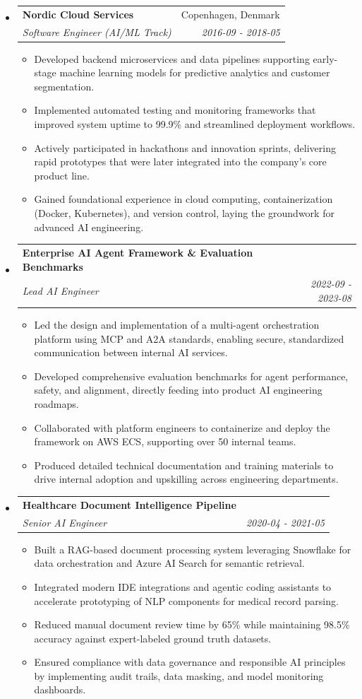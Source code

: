 \documentclass[letterpaper,11pt]{article}
\makeatletter
\newlength{\outerbordwidth}
\newcommand{\resitem}[1]{\item #1 \vspace{-2pt}}
\newcommand{\resheading}[1]{\vspace{6pt}
    \parbox{\textwidth}{\setlength{\FrameSep}{\outerbordwidth}
        \begin{shaded}
    \setlength{\fboxsep}{0pt}\framebox[\textwidth][l]{\setlength{\fboxsep}{2pt}\fcolorbox{shadecolorB}{shadecolorB}{\textbf{\sffamily{\mbox{~}\makebox[6.8in][l]{\large #1} \vphantom{p\^{E}}}}}}
        \end{shaded}
    }\vspace{-6pt}
    }
\newcommand{\ressubheading}[4]{
    \begin{tabular*}{6.5in}{p{4.8in}@{\extracolsep{\fill}}r}
            \textbf{#1} & #2 \\
            \textit{#3} & \textit{#4} \\
    \end{tabular*}\vspace{-8pt}}
\makeatother
\begin{document}
\begin{itemize}
\begin{itemize}
        \end{itemize}
        \item \ressubheading{Nordic Cloud Services}{Copenhagen, Denmark}{Software Engineer (AI/ML Track)}{2016-09 - 2018-05}
        \begin{itemize}
            \resitem{Developed backend microservices and data pipelines supporting early-stage machine learning models for predictive analytics and customer segmentation.}
            \resitem{Implemented automated testing and monitoring frameworks that improved system uptime to 99.9\% and streamlined deployment workflows.}
            \resitem{Actively participated in hackathons and innovation sprints, delivering rapid prototypes that were later integrated into the company’s core product line.}
            \resitem{Gained foundational experience in cloud computing, containerization (Docker, Kubernetes), and version control, laying the groundwork for advanced AI engineering.}
        \end{itemize}
      \end{itemize}
      \resheading{Projects}
      \begin{itemize}
        \item \ressubheading{Enterprise AI Agent Framework \& Evaluation Benchmarks}{}{Lead AI Engineer}{2022-09 - 2023-08}
        \begin{itemize}
            \resitem{Led the design and implementation of a multi-agent orchestration platform using MCP and A2A standards, enabling secure, standardized communication between internal AI services.}
            \resitem{Developed comprehensive evaluation benchmarks for agent performance, safety, and alignment, directly feeding into product AI engineering roadmaps.}
            \resitem{Collaborated with platform engineers to containerize and deploy the framework on AWS ECS, supporting over 50 internal teams.}
            \resitem{Produced detailed technical documentation and training materials to drive internal adoption and upskilling across engineering departments.}
        \end{itemize}
        \item \ressubheading{Healthcare Document Intelligence Pipeline}{}{Senior AI Engineer}{2020-04 - 2021-05}
        \begin{itemize}
            \resitem{Built a RAG-based document processing system leveraging Snowflake for data orchestration and Azure AI Search for semantic retrieval.}
            \resitem{Integrated modern IDE integrations and agentic coding assistants to accelerate prototyping of NLP components for medical record parsing.}
            \resitem{Reduced manual document review time by 65\% while maintaining 98.5\% accuracy against expert-labeled ground truth datasets.}
            \resitem{Ensured compliance with data governance and responsible AI principles by implementing audit trails, data masking, and model monitoring dashboards.}
        \end{itemize}
      \end{itemize}
\end{document}
